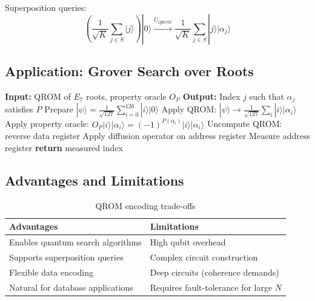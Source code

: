 Superposition queries:
\begin{equation}
\left(\frac{1}{\sqrt{K}} \sum_{j \in S} |j\rangle\right) |0\rangle \xrightarrow{U_{\text{QROM}}} \frac{1}{\sqrt{K}} \sum_{j \in S} |j\rangle |\alpha_j\rangle
\end{equation}

\subsection{Application: Grover Search over Roots}

\begin{algorithm}[H]
\caption{Grover Search for Root with Property $P$}
\label{alg:grover_root_search}
\begin{algorithmic}[1]
\State \textbf{Input:} QROM of $E_7$ roots, property oracle $O_P$
\State \textbf{Output:} Index $j$ such that $\alpha_j$ satisfies $P$
\State
\State Prepare $|\psi\rangle = \frac{1}{\sqrt{127}} \sum_{i=0}^{126} |i\rangle |0\rangle$
\State
{}
    \State Apply QROM: $|\psi\rangle \to \frac{1}{\sqrt{127}} \sum_i |i\rangle |\alpha_i\rangle$
    \State Apply property oracle: $O_P |i\rangle |\alpha_i\rangle = (-1)^{P(\alpha_i)} |i\rangle |\alpha_i\rangle$
    \State Uncompute QROM: reverse data register
    \State Apply diffusion operator on address register
\EndFor
\State
\State Measure address register
\State \textbf{return} measured index
\end{algorithmic}
\end{algorithm}

\subsection{Advantages and Limitations}

\begin{table}[h]
\centering
\begin{tabular}{p{6cm}p{6cm}}
\toprule
\textbf{Advantages} & \textbf{Limitations} \\
\midrule
Enables quantum search algorithms & High qubit overhead \\
Supports superposition queries & Complex circuit construction \\
Flexible data encoding & Deep circuits (coherence demands) \\
Natural for database applications & Requires fault-tolerance for large $N$ \\
\bottomrule
\end{tabular}
\caption{QROM encoding trade-offs}
\label{tab:qrom_encoding_tradeoffs}
\end{table}

